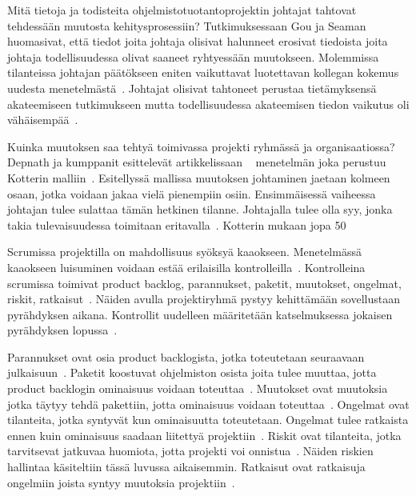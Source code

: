 \documentclass[finnish]{tktltiki2}
\theoremstyle{definition}
\theoremstyle{remark}
\begin{document}
Mitä tietoja ja todisteita ohjelmistotuotantoprojektin johtajat tahtovat tehdessään muutosta kehitysprosessiin? Tutkimuksessaan Gou ja Seaman huomasivat, että tiedot joita johtaja olisivat halunneet erosivat tiedoista joita johtaja todellisuudessa olivat saaneet ryhtyessään muutokseen. Molemmissa tilanteissa johtajan päätökseen eniten vaikuttavat luotettavan kollegan kokemus uudesta menetelmästä~\cite{Guo:2008:SSP:1414004.1414046}. Johtajat olisivat tahtoneet perustaa tietämyksensä akateemiseen tutkimukseen mutta todellisuudessa akateemisen tiedon vaikutus oli vähäisempää~\cite{Guo:2008:SSP:1414004.1414046}.

Kuinka muutoksen saa tehtyä toimivassa projekti ryhmässä ja organisaatiossa? Depnath ja kumppanit esittelevät artikkelissaan ~\cite{4017705} menetelmän joka perustuu Kotterin malliin~\cite{kotter1995leading}. Esitellyssä mallissa muutoksen johtaminen jaetaan kolmeen osaan, jotka voidaan jakaa vielä pienempiin osiin. Ensimmäisessä vaiheessa johtajan tulee sulattaa tämän hetkinen tilanne. Johtajalla tulee olla syy, jonka takia tulevaisuudessa toimitaan eritavalla~\cite{4017705}. Kotterin mukaan jopa 50%

Scrumissa projektilla on mahdollisuus syöksyä kaaokseen. Menetelmässä kaaokseen luisuminen voidaan estää erilaisilla kontrolleilla~\cite{schwaber1995scrum}. Kontrolleina scrumissa toimivat product backlog, parannukset, paketit, muutokset, ongelmat, riskit, ratkaisut~\cite{schwaber1995scrum}. Näiden avulla projektiryhmä pystyy kehittämään sovellustaan pyrähdyksen aikana. Kontrollit uudelleen määritetään katselmuksessa jokaisen pyrähdyksen lopussa~\cite{schwaber1995scrum}.

Parannukset ovat osia product backlogista, jotka toteutetaan seuraavaan julkaisuun~\cite{schwaber1995scrum}. Paketit koostuvat ohjelmiston osista joita tulee muuttaa, jotta product backlogin ominaisuus voidaan toteuttaa~\cite{schwaber1995scrum}. Muutokset ovat muutoksia jotka täytyy tehdä pakettiin, jotta ominaisuus voidaan toteuttaa~\cite{schwaber1995scrum}. Ongelmat ovat tilanteita, jotka syntyvät kun ominaisuutta toteutetaan. Ongelmat tulee ratkaista ennen kuin ominaisuus saadaan liitettyä projektiin~\cite{schwaber1995scrum}. Riskit ovat tilanteita, jotka tarvitsevat jatkuvaa huomiota, jotta projekti voi onnistua~\cite{schwaber1995scrum}. Näiden riskien hallintaa käsiteltiin tässä luvussa aikaisemmin. Ratkaisut ovat ratkaisuja ongelmiin joista syntyy muutoksia projektiin~\cite{schwaber1995scrum}.
\end{document}
